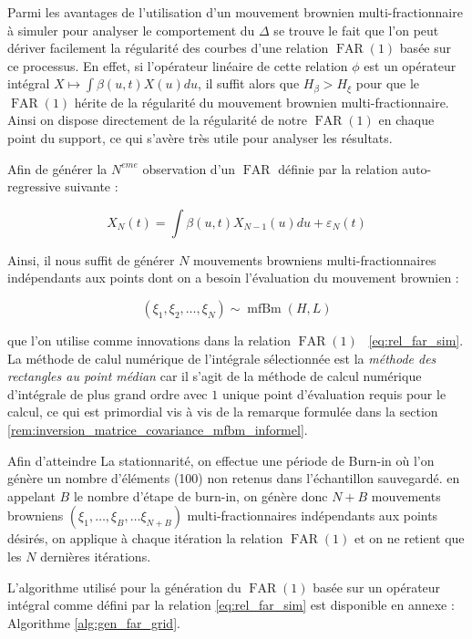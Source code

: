 
Parmi les avantages de l'utilisation d'un mouvement brownien multi-fractionnaire à simuler pour analyser le comportement du $\Delta$ se trouve le fait que l'on peut dériver facilement la régularité des courbes d'une relation $\operatorname{FAR}(1)$ basée sur ce processus. En effet, si l'opérateur linéaire de cette relation $\phi$ est un opérateur intégral $X \mapsto \int \beta(u,t) X(u)du$, il suffit alors que $H_\beta > H_\xi$ pour que le $\operatorname{FAR}(1)$ hérite de la régularité du mouvement brownien multi-fractionnaire. Ainsi on dispose directement de la régularité de notre $\operatorname{FAR}(1)$ en chaque point du support, ce qui s'avère très utile pour analyser les résultats.

Afin de générer la $N^{eme}$ observation d'un $\operatorname{FAR}$ définie par la relation auto-regressive suivante :

\begin{equation}
	X_N(t) = \int \beta(u,t)X_{N-1}(u)du + \varepsilon_N(t) \label{eq:rel_far_sim}
\end{equation}

Ainsi, il nous suffit de générer $N$ mouvements browniens multi-fractionnaires indépendants aux points dont on a besoin l'évaluation du mouvement brownien :

\begin{equation*}
	(\xi_1 , \xi_2, \dots , \xi_N ) \sim \operatorname{mfBm}(H, L)
\end{equation*}



\noindent que l'on utilise comme innovations dans la relation $\operatorname{FAR}(1)$ ~\ref{eq:rel_far_sim}. La méthode de calul numérique de l'intégrale sélectionnée est la \emph{méthode des rectangles au point médian} car il s'agit de la méthode de calcul numérique d'intégrale de plus grand ordre avec $1$ unique point d'évaluation requis pour le calcul, ce qui est primordial vis à vis de la remarque formulée dans la section \ref{rem:inversion_matrice_covariance_mfbm_informel}.

\bigskip

Afin d'atteindre La stationnarité, on effectue une période de \og Burn-in \fg où l'on génère un nombre d'éléments (100) non retenus dans l'échantillon sauvegardé. en appelant $B$ le nombre d'étape de burn-in, on génère donc $N+B$ mouvements browniens $(\xi_1 , \dots ,\xi_B, \dots \xi_{N+B} )$ multi-fractionnaires indépendants aux points désirés, on applique à chaque itération la relation $\operatorname{FAR}(1)$ et on ne retient que les $N$ dernières itérations.

\bigskip

L'algorithme utilisé pour la génération du $\operatorname{FAR}(1)$ basée sur un opérateur intégral comme défini par la relation \ref{eq:rel_far_sim} est disponible en annexe : Algorithme \ref{alg:gen_far_grid}.
